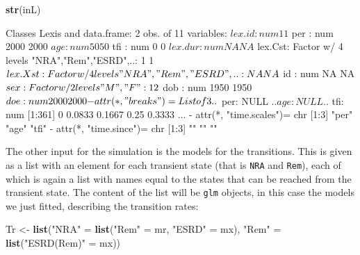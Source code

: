 \documentclass[
]{book}
\newenvironment{Shaded}{\begin{snugshade}}{\end{snugshade}}
\newcommand{\FunctionTok}[1]{\textcolor[rgb]{0.13,0.29,0.53}{\textbf{#1}}}
\newcommand{\NormalTok}[1]{#1}
\newcommand{\OtherTok}[1]{\textcolor[rgb]{0.56,0.35,0.01}{#1}}
\newcommand{\StringTok}[1]{\textcolor[rgb]{0.31,0.60,0.02}{#1}}
\begin{document}
\begin{enumerate}
\begin{Shaded}
\begin{Highlighting}[]
\FunctionTok{str}\NormalTok{(inL)}
\end{Highlighting}
\end{Shaded}

\begin{Shaded}
\begin{Highlighting}[]
\NormalTok{Classes \textquotesingle{}Lexis\textquotesingle{} and \textquotesingle{}data.frame\textquotesingle{}:   2 obs. of  11 variables:}
\NormalTok{ $ lex.id : num  1 1}
\NormalTok{ $ per    : num  2000 2000}
\NormalTok{ $ age    : num  50 50}
\NormalTok{ $ tfi    : num  0 0}
\NormalTok{ $ lex.dur: num  NA NA}
\NormalTok{ $ lex.Cst: Factor w/ 4 levels "NRA","Rem","ESRD",..: 1 1}
\NormalTok{ $ lex.Xst: Factor w/ 4 levels "NRA","Rem","ESRD",..: NA NA}
\NormalTok{ $ id     : num  NA NA}
\NormalTok{ $ sex    : Factor w/ 2 levels "M","F": 1 2}
\NormalTok{ $ dob    : num  1950 1950}
\NormalTok{ $ doe    : num  2000 2000}
\NormalTok{ {-} attr(*, "breaks")=List of 3}
\NormalTok{  ..$ per: NULL}
\NormalTok{  ..$ age: NULL}
\NormalTok{  ..$ tfi: num [1:361] 0 0.0833 0.1667 0.25 0.3333 ...}
\NormalTok{ {-} attr(*, "time.scales")= chr [1:3] "per" "age" "tfi"}
\NormalTok{ {-} attr(*, "time.since")= chr [1:3] "" "" ""}
\end{Highlighting}
\end{Shaded}

  The other input for the simulation is the models for the transitions. This is given as
  a list with an element for each transient state (that is \texttt{NRA} and
  \texttt{Rem}), each of which is again a list with names equal to the
  states that can be reached from the transient state. The content of
  the list will be \texttt{glm} objects, in this case the models we
  just fitted, describing the transition rates:

\begin{Shaded}
\begin{Highlighting}[]
\NormalTok{Tr }\OtherTok{\textless{}{-}} \FunctionTok{list}\NormalTok{(}\StringTok{"NRA"} \OtherTok{=} \FunctionTok{list}\NormalTok{(}\StringTok{"Rem"}  \OtherTok{=}\NormalTok{ mr,}
                        \StringTok{"ESRD"} \OtherTok{=}\NormalTok{ mx),}
           \StringTok{"Rem"} \OtherTok{=} \FunctionTok{list}\NormalTok{(}\StringTok{"ESRD(Rem)"} \OtherTok{=}\NormalTok{ mx))}
\end{Highlighting}
\end{Shaded}


\end{enumerate}
\end{document}
